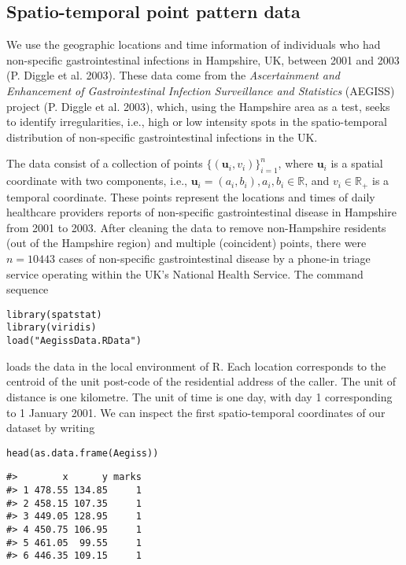\hypertarget{spatio-temporal-point-pattern-data}{%
\subsection{Spatio-temporal point pattern data}\label{spatio-temporal-point-pattern-data}}

We use the geographic locations and time information of individuals who had non-specific gastrointestinal infections in Hampshire, UK, between 2001 and 2003 (P. Diggle et al. 2003). These data come from the \emph{Ascertainment and Enhancement of Gastrointestinal Infection Surveillance and Statistics} (AEGISS) project (P. Diggle et al. 2003), which, using the Hampshire area as a test, seeks to identify irregularities, i.e., high or low intensity spots in the spatio-temporal distribution of non-specific gastrointestinal infections in the UK.

The data consist of a collection of points \(\{(\mathbf{u}_i,v_i)\}_{i=1}^n\), where \(\mathbf{u}_i\) is a spatial coordinate with two components, i.e., \(\mathbf{u}_i = (a_i, b_i), a_i,b_i \in \mathbb{R}\), and \(v_i\in \mathbb{R}_+\) is a temporal coordinate. These points represent the locations and times of daily healthcare providers reports of non-specific gastrointestinal disease in Hampshire from 2001 to 2003. After cleaning the data to remove non-Hampshire residents (out of the Hampshire region) and multiple (coincident) points, there were \(n = 10443\) cases of non-specific gastrointestinal disease by a phone-in triage service operating within the UK's National Health Service. The command sequence

\begin{verbatim}
library(spatstat)
library(viridis)
load("AegissData.RData")
\end{verbatim}

loads the data in the local environment of R. Each location corresponds to the centroid of the unit post-code of the residential address of the caller. The unit of distance is one kilometre. The unit of time is one day, with day 1 corresponding to 1 January 2001. We can inspect the first spatio-temporal coordinates of our dataset by writing

\begin{verbatim}
head(as.data.frame(Aegiss))
\end{verbatim}

\begin{verbatim}
#>        x      y marks
#> 1 478.55 134.85     1
#> 2 458.15 107.35     1
#> 3 449.05 128.95     1
#> 4 450.75 106.95     1
#> 5 461.05  99.55     1
#> 6 446.35 109.15     1
\end{verbatim}

